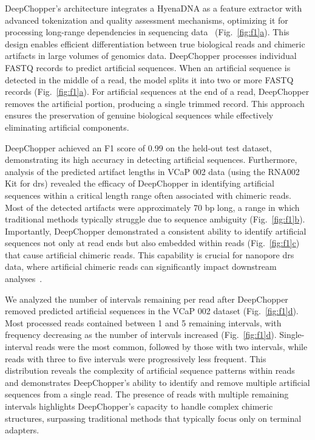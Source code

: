 \documentclass[pdflatex, sn-mathphys-num, lineno]{sn-jnl}%
\newcommand{\figref}[2]{Fig.~\hyperref[#1]{\ref*{#1}#2}}
\theoremstyle{thmstyleone}%
\theoremstyle{thmstyletwo}%
\theoremstyle{thmstylethree}%
\begin{document}
DeepChopper's architecture integrates a HyenaDNA as a feature extractor with advanced tokenization and quality assessment mechanisms, optimizing it for processing long-range dependencies in sequencing data~\cite{nguyen2024hyenadna} (\figref{fig:f1}{a}).
This design enables efficient differentiation between true biological reads and chimeric artifacts in large volumes of genomics data.
DeepChopper processes individual FASTQ records to predict artificial sequences.
When an artificial sequence is detected in the middle of a read, the model splits it into two or more FASTQ records (\figref{fig:f1}{a}).
For artificial sequences at the end of a read, DeepChopper removes the artificial portion, producing a single trimmed record.
This approach ensures the preservation of genuine biological sequences while effectively eliminating artificial components.

DeepChopper achieved an F1 score of 0.99 on the held-out test dataset, demonstrating its high accuracy in detecting artificial sequences.
Furthermore, analysis of the predicted artifact lengths in VCaP 002 data (using the RNA002 Kit for \gls{drs}) revealed the efficacy of DeepChopper in identifying artificial sequences within a critical length range often associated with chimeric reads.
Most of the detected artifacts were approximately 70 bp long, a range in which traditional methods typically struggle due to sequence ambiguity (\figref{fig:f1}{b}).
Importantly, DeepChopper demonstrated a consistent ability to identify artificial sequences not only at read ends but also embedded within reads (\figref{fig:f1}{c}) that cause artificial chimeric reads.
This capability is crucial for nanopore \gls{drs} data, where artificial chimeric reads can significantly impact downstream analyses~\cite{smith2020molecular}.

We analyzed the number of intervals remaining per read after DeepChopper removed predicted artificial sequences in the VCaP 002 dataset (\figref{fig:f1}{d}). 
Most processed reads contained between 1 and 5 remaining intervals, with frequency decreasing as the number of intervals increased (\figref{fig:f1}{d}). 
Single-interval reads were the most common, followed by those with two intervals, while reads with three to five intervals were progressively less frequent.
This distribution reveals the complexity of artificial sequence patterns within reads and demonstrates DeepChopper's ability to identify and remove multiple artificial sequences from a single read. 
The presence of reads with multiple remaining intervals highlights DeepChopper's capacity to handle complex chimeric structures, surpassing traditional methods that typically focus only on terminal adapters.
\end{document}
